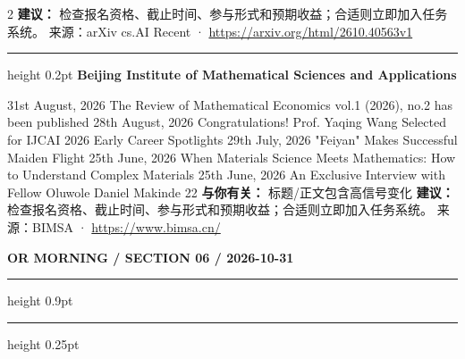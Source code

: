 \documentclass[10.5pt]{ctexart}
\begin{document}
\begin{multicols}{2}
\textbf{建议：} 检查报名资格、截止时间、参与形式和预期收益；合适则立即加入任务系统。
{\footnotesize\color{ormuted} 来源：arXiv cs.AI Recent · \url{https://arxiv.org/html/2610.40563v1}}
\vspace{2mm}
\hrule height 0.2pt
\vspace{2mm}
{\large\bfseries Beijing Institute of Mathematical Sciences and Applications}\par
31st August, 2026 The Review of Mathematical Economics vol.1 (2026), no.2 has been published 28th August, 2026 Congratulations! Prof. Yaqing Wang Selected for IJCAI 2026 Early Career Spotlights 29th July, 2026 "Feiyan" Makes Successful Maiden Flight 25th June, 2026 When Materials Science Meets Mathematics: How to Understand Complex Materials 25th June, 2026 An Exclusive Interview with Fellow Oluwole Daniel Makinde 22
\textbf{与你有关：} 标题/正文包含高信号变化
\textbf{建议：} 检查报名资格、截止时间、参与形式和预期收益；合适则立即加入任务系统。
{\footnotesize\color{ormuted} 来源：BIMSA · \url{https://www.bimsa.cn/}}
\end{multicols}
\newpage
{\small\bfseries OR MORNING / SECTION 06 / 2026-10-31}
\vspace{2mm}
\hrule height 0.9pt
\vspace{1.5mm}
\hrule height 0.25pt
\vspace{4mm}
\end{document}
